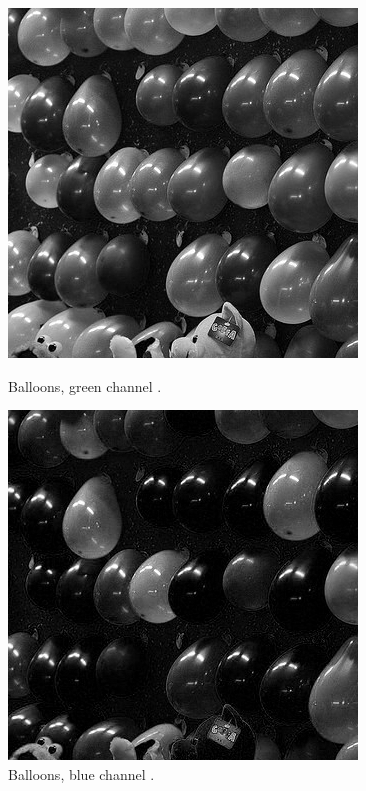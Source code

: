 \begin{figure}[ht]
    \begin{minipage}[t]{0.45\linewidth}
        \centering
        \includegraphics[width=\textwidth]{images/balloons/balloons-green-channel.jpg}
        \caption{Balloons, green channel \cite{balloons}.}
        \label{fig:balloons-green}
    \end{minipage}
    \hspace{0.5cm}
    \begin{minipage}[t]{0.45\linewidth}
        \centering
        \includegraphics[width=\textwidth]{images/balloons/balloons-blue-channel.jpg}
        \caption{Balloons, blue channel \cite{balloons}.}
        \label{fig:balloons-blue}
    \end{minipage}
\end{figure}

